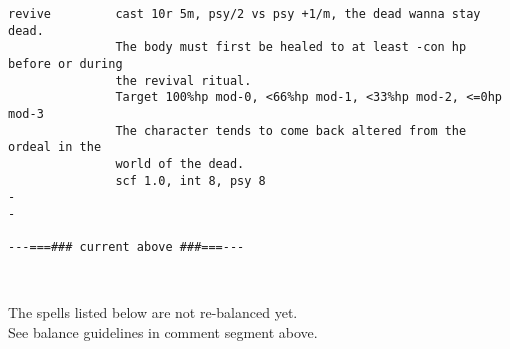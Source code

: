 \begin{verbatim}
revive         cast 10r 5m, psy/2 vs psy +1/m, the dead wanna stay dead.
               The body must first be healed to at least -con hp before or during
               the revival ritual.
               Target 100%hp mod-0, <66%hp mod-1, <33%hp mod-2, <=0hp mod-3
               The character tends to come back altered from the ordeal in the
               world of the dead.
               scf 1.0, int 8, psy 8
-
-

---===### current above ###===---
\end{verbatim} \normalsize

\

\noindent 
The spells listed below are not re-balanced yet.\\
See balance guidelines in comment segment above.

\

